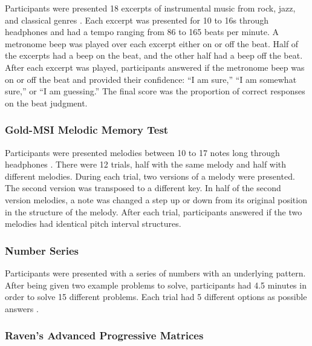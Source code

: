 \documentclass[12pt,]{book}
\begin{document}
Participants were presented 18 excerpts of instrumental music from rock, jazz, and classical genres \citep{mullensiefenMusicalityNonMusiciansIndex2014}.
Each excerpt was presented for 10 to 16s through headphones and had a tempo ranging from 86 to 165 beats per
minute.
A metronome beep was played over each excerpt either on or off the beat.
Half of the excerpts had a beep on the beat, and the other half had a beep off the beat.
After each excerpt was played, participants answered if the metronome beep was on or off the beat and provided their confidence: ``I am sure,'' ``I am somewhat sure,'' or ``I am guessing.''
The final score was the proportion of correct responses on the beat judgment.

\hypertarget{gold-msi-melodic-memory-test}{%
\subsubsection{Gold-MSI Melodic Memory Test}\label{gold-msi-melodic-memory-test}}

Participants were presented melodies between 10 to 17 notes long through headphones \citep{mullensiefenMusicalityNonMusiciansIndex2014}.
There were 12 trials, half with the same melody and half with different melodies.
During each trial, two versions of a melody were presented.
The second version was transposed to a different key.
In half of the second version melodies, a note was changed a step up or down from its original position in the structure of the melody.
After each trial, participants answered if the two melodies had identical pitch interval structures.

\hypertarget{number-series}{%
\subsubsection{Number Series}\label{number-series}}

Participants were presented with a series of numbers with
an underlying pattern.
After being given two example problems to solve, participants had 4.5 minutes in order to solve 15 different problems.
Each trial had 5 different options as possible answers \citep{thurstonePrimaryMentalAbilities1938}.

\hypertarget{ravens-advanced-progressive-matrices}{%
\subsubsection{Raven's Advanced Progressive Matrices}\label{ravens-advanced-progressive-matrices}}
\end{document}
